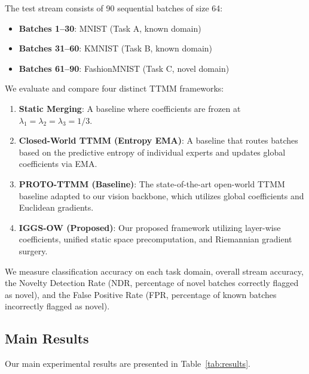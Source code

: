 \documentclass{article}
\theoremstyle{plain}
\theoremstyle{definition}
\theoremstyle{remark}
\begin{document}
The test stream consists of 90 sequential batches of size 64:
\begin{itemize}
    \item \textbf{Batches 1--30}: MNIST (Task A, known domain)
    \item \textbf{Batches 31--60}: KMNIST (Task B, known domain)
    \item \textbf{Batches 61--90}: FashionMNIST (Task C, novel domain)
\end{itemize}

We evaluate and compare four distinct TTMM frameworks:
\begin{enumerate}
    \item \textbf{Static Merging}: A baseline where coefficients are frozen at $\lambda_1 = \lambda_2 = \lambda_3 = 1/3$.
    \item \textbf{Closed-World TTMM (Entropy EMA)}: A baseline that routes batches based on the predictive entropy of individual experts and updates global coefficients via EMA.
    \item \textbf{PROTO-TTMM (Baseline)}: The state-of-the-art open-world TTMM baseline \cite{authors26b} adapted to our vision backbone, which utilizes global coefficients and Euclidean gradients.
    \item \textbf{IGGS-OW (Proposed)}: Our proposed framework utilizing layer-wise coefficients, unified static space precomputation, and Riemannian gradient surgery.
\end{enumerate}

We measure classification accuracy on each task domain, overall stream accuracy, the Novelty Detection Rate (NDR, percentage of novel batches correctly flagged as novel), and the False Positive Rate (FPR, percentage of known batches incorrectly flagged as novel).

\subsection{Main Results}
Our main experimental results are presented in Table~\ref{tab:results}.
\end{document}
